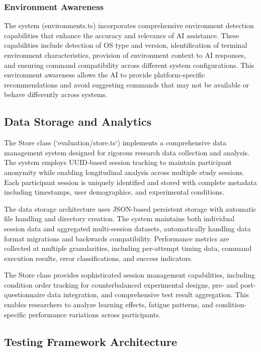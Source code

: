\subsubsection{Environment Awareness}

The system (environments.ts) incorporates comprehensive environment detection capabilities that enhance the accuracy and relevance of AI assistance. These capabilities include detection of OS type and version, identification of terminal environment characteristics, provision of environment context to AI responses, and ensuring command compatibility across different system configurations. This environment awareness allows the AI to provide platform-specific recommendations and avoid suggesting commands that may not be available or behave differently across systems.

\subsection{Data Storage and Analytics}

The Store class (`evaluation/store.ts`) implements a comprehensive data management system designed for rigorous research data collection and analysis. The system employs UUID-based session tracking to maintain participant anonymity while enabling longitudinal analysis across multiple study sessions. Each participant session is uniquely identified and stored with complete metadata including timestamps, user demographics, and experimental conditions.

The data storage architecture uses JSON-based persistent storage with automatic file handling and directory creation. The system maintains both individual session data and aggregated multi-session datasets, automatically handling data format migrations and backwards compatibility. Performance metrics are collected at multiple granularities, including per-attempt timing data, command execution results, error classifications, and success indicators.

The Store class provides sophisticated session management capabilities, including condition order tracking for counterbalanced experimental designs, pre- and post-questionnaire data integration, and comprehensive test result aggregation. This enables researchers to analyze learning effects, fatigue patterns, and condition-specific performance variations across participants.

\subsection{Testing Framework Architecture}


